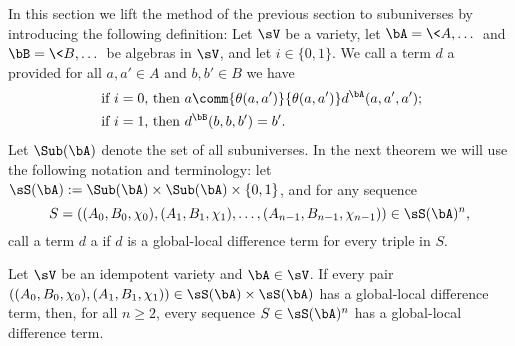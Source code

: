 In this section we lift the method of the previous section to subuniverses
by introducing the following definition:
Let $\sV$ be a variety, let $\bA = \<A, \dots\>$ and $\bB = \<B, \dots\>$ be algebras in
$\sV$, and let $i\in \{0,1\}$.
We call a term $d$ a 
provided for all $a, a'\in A$ and $b, b' \in B$ we have
\begin{align}
\text{ if $i=0$, then } & a \comm{\theta(a,a')}{\theta(a,a')} d^{\bA}(a,a',a');
\label{eq:global-diff-triple}\\
\text{ if $i=1$, then } &
d^{\bB}(b,b,b') = b'. 
\end{align}
Let $\Sub(\bA)$ denote the set of all
subuniverses. In the next theorem we will use the following notation and terminology:
let $\sS(\bA):= \Sub(\bA) \times \Sub(\bA) \times \{0,1\}$, and for any
sequence
\[S = ((A_0, B_0, \chi_0), (A_1, B_1, \chi_1), \dots,
(A_{n-1},B_{n-1},\chi_{n-1})) \in \sS(\bA)^n,
\]
call a term $d$ a 
if $d$ is a global-local difference term for every triple in $S$.
\begin{thm}
  \label{thm:global-local-diff-terms}
  Let $\sV$ be an idempotent variety and
  $\bA \in \sV$. 
  If every pair
  $((A_0, B_0, \chi_0), (A_1, B_1, \chi_1)) \in \sS(\bA) \times \sS(\bA)$
  has a global-local difference term,
  then, for all $n\geq 2$, every sequence $S \in \sS(\bA)^n$
  has a global-local difference term.
\end{thm}
